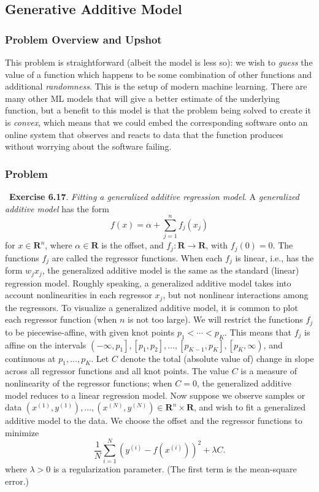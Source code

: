 \documentclass[12pt,reqno]{article}
\theoremstyle{definition}
\numberwithin{equation}{section}
\begin{document}
\subsection{Generative Additive Model}

\subsubsection*{Problem Overview and Upshot}
This problem is straightforward (albeit the model is less so): we wish to \textit{guess} the value
of a function which happens to be some combination of other functions and additional \textit{randomness}.
This is the setup of modern machine learning. There are many other ML models that will
give a better estimate of the underlying function, but a benefit to this model is that
the problem being solved to create it is \textit{convex}, which means that we could embed the corresponding software
onto an online system that observes and reacts to data that the function produces without worrying about
the software failing. 

\subsubsection*{Problem}
~\cite{EE364a-extra}\textbf{Exercise 6.17}. \textit{Fitting a generalized additive regression model}.
A \textit{generalized additive model} has the form
\[
f(x)=\alpha+\sum_{j=1}^n f_j\left(x_j\right)
\]
for $x \in \mathbf{R}^n$, where $\alpha \in \mathbf{R}$ is the offset, and $f_j: \mathbf{R} \rightarrow \mathbf{R}$, with $f_j(0)=0$.
The functions $f_j$ are called the regressor functions. When each $f_j$ is linear, i.e., has the form $w_j x_j$,
the generalized additive model is the same as the standard (linear) regression model.
Roughly speaking, a generalized additive model takes into account nonlinearities in each regressor $x_j$, but not nonlinear interactions among the regressors.
To visualize a generalized additive model, it is common to plot each regressor function (when $n$ is not too large).
We will restrict the functions $f_j$ to be piecewise-affine, with given knot points $p_1<\cdots<p_K$. This means that $f_j$ is affine on the intervals
$\left(-\infty, p_1\right],\left[p_1, p_2\right], \ldots,\left[p_{K-1}, p_K\right],\left[p_K, \infty\right)$, and continuous at $p_1, \ldots, p_K$.
Let $C$ denote the total (absolute value of) change in slope across all regressor functions and all knot points.
The value $C$ is a measure of nonlinearity of the regressor functions; when $C=0$, the generalized additive model reduces to a linear regression model.
Now suppose we observe samples or data $\left(x^{(1)}, y^{(1)}\right), \ldots,\left(x^{(N)}, y^{(N)}\right) \in \mathbf{R}^n \times \mathbf{R}$,
and wish to fit a generalized additive model to the data. We choose the offset and the regressor functions to minimize
\[
\frac{1}{N} \sum_{i=1}^N\left(y^{(i)}-f(x^{(i)})\right)^2+\lambda C.
\]
where $\lambda>0$ is a regularization parameter. (The first term is the mean-square error.)
\end{document}
